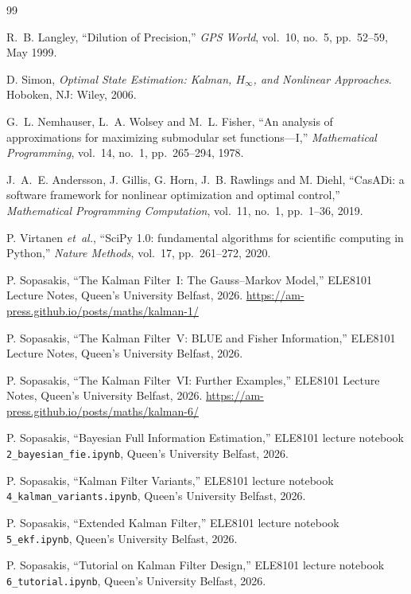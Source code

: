 \documentclass[11pt,a4paper]{article}
\newcommand{\code}[1]{\texttt{#1}}
\begin{document}
\begin{thebibliography}{99}

R.~B. Langley, ``Dilution of Precision,''
\emph{GPS World}, vol.~10, no.~5, pp.~52--59, May 1999.

D. Simon, \emph{Optimal State Estimation: Kalman, $H_\infty$, and
Nonlinear Approaches}. Hoboken, NJ: Wiley, 2006.

G.~L. Nemhauser, L.~A. Wolsey and M.~L. Fisher, ``An analysis of
approximations for maximizing submodular set functions---I,''
\emph{Mathematical Programming}, vol.~14, no.~1, pp.~265--294, 1978.

J.~A.~E. Andersson, J. Gillis, G. Horn, J.~B. Rawlings and M. Diehl,
``CasADi: a software framework for nonlinear optimization and optimal
control,'' \emph{Mathematical Programming Computation}, vol.~11,
no.~1, pp.~1--36, 2019.

P. Virtanen \emph{et~al.}, ``SciPy 1.0: fundamental algorithms for
scientific computing in Python,'' \emph{Nature Methods}, vol.~17,
pp.~261--272, 2020.

P. Sopasakis, ``The Kalman Filter~I: The Gauss--Markov Model,''
ELE8101 Lecture Notes, Queen's University Belfast, 2026.
\url{https://am-press.github.io/posts/maths/kalman-1/}

P. Sopasakis, ``The Kalman Filter~V: BLUE and Fisher Information,''
ELE8101 Lecture Notes, Queen's University Belfast, 2026.

P. Sopasakis, ``The Kalman Filter~VI: Further Examples,''
ELE8101 Lecture Notes, Queen's University Belfast, 2026.
\url{https://am-press.github.io/posts/maths/kalman-6/}

P. Sopasakis, ``Bayesian Full Information Estimation,'' ELE8101
lecture notebook \code{2\_bayesian\_fie.ipynb}, Queen's University
Belfast, 2026.

P. Sopasakis, ``Kalman Filter Variants,'' ELE8101 lecture notebook
\code{4\_kalman\_variants.ipynb}, Queen's University Belfast, 2026.

P. Sopasakis, ``Extended Kalman Filter,'' ELE8101 lecture notebook
\code{5\_ekf.ipynb}, Queen's University Belfast, 2026.

P. Sopasakis, ``Tutorial on Kalman Filter Design,'' ELE8101 lecture
notebook \code{6\_tutorial.ipynb}, Queen's University Belfast, 2026.

\end{thebibliography}
\end{document}

